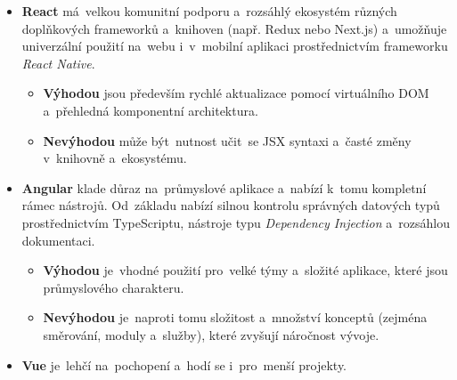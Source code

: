 \begin{itemize}
    \item \textbf{React} má~velkou komunitní podporu a~rozsáhlý ekosystém
        různých doplňkových frameworků a~knihoven (např. Redux nebo Next.js)
        a~umožňuje univerzální použití na~webu i~v~mobilní aplikaci
        prostřednictvím frameworku \emph{React Native}.
        \cite{Upadhyaya2025} %
        
        \begin{itemize}
            \item \textbf{Výhodou} jsou především rychlé aktualizace
                pomocí virtuálního DOM a~přehledná komponentní
                architektura. \cite{YHVfLHsNlUItkF6G,1WL9hIh67tHjtVTy}
            \item \textbf{Nevýhodou} může být~nutnost učit~se JSX syntaxi
                a~časté změny v~knihovně a~ekosystému.
        \end{itemize}
    \item \textbf{Angular} klade důraz na~průmyslové aplikace a~nabízí
        k~tomu kompletní rámec nástrojů. Od~základu nabízí silnou kontrolu
        správných datových typů prostřednictvím TypeScriptu, nástroje
        typu \emph{Dependency Injection} a~rozsáhlou dokumentaci.
        \cite{YHVfLHsNlUItkF6G,1WL9hIh67tHjtVTy} %

        \begin{itemize}
            \item \textbf{Výhodou} je~vhodné použití pro~velké týmy
                a~složité aplikace, které jsou průmyslového charakteru.
                \cite{YHVfLHsNlUItkF6G,1WL9hIh67tHjtVTy}
            \item \textbf{Nevýhodou} je~naproti tomu složitost a~množství
                konceptů (zejména směrování, moduly a~služby), které
                zvyšují náročnost vývoje.
                \cite{YHVfLHsNlUItkF6G,1WL9hIh67tHjtVTy}
        \end{itemize}
    \item \textbf{Vue} je~lehčí na~pochopení a~hodí se i~pro~menší projekty.


\end{itemize}
